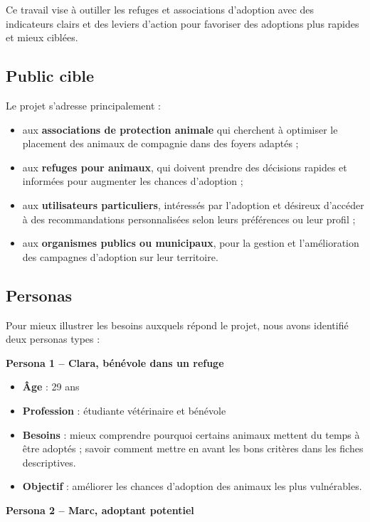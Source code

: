 \documentclass[a4paper,12pt]{article}
\begin{document}
Ce travail vise à outiller les refuges et associations d’adoption avec des indicateurs clairs et des leviers d’action pour favoriser des adoptions plus rapides et mieux ciblées.

\subsection{Public cible}

Le projet s’adresse principalement :
\begin{itemize}
    \item aux \textbf{associations de protection animale} qui cherchent à optimiser le placement des animaux de compagnie dans des foyers adaptés ;
    \item aux \textbf{refuges pour animaux}, qui doivent prendre des décisions rapides et informées pour augmenter les chances d’adoption ;
    \item aux \textbf{utilisateurs particuliers}, intéressés par l’adoption et désireux d’accéder à des recommandations personnalisées selon leurs préférences ou leur profil ;
    \item aux \textbf{organismes publics ou municipaux}, pour la gestion et l'amélioration des campagnes d'adoption sur leur territoire.
\end{itemize}

\subsection{Personas}

Pour mieux illustrer les besoins auxquels répond le projet, nous avons identifié deux personas types :

\vspace{1em}
\textbf{Persona 1 – Clara, bénévole dans un refuge}

\begin{itemize}
    \item \textbf{Âge} : 29 ans
    \item \textbf{Profession} : étudiante vétérinaire et bénévole
    \item \textbf{Besoins} : mieux comprendre pourquoi certains animaux mettent du temps à être adoptés ; savoir comment mettre en avant les bons critères dans les fiches descriptives.
    \item \textbf{Objectif} : améliorer les chances d’adoption des animaux les plus vulnérables.
\end{itemize}

\vspace{1em}
\textbf{Persona 2 – Marc, adoptant potentiel}
\end{document}
